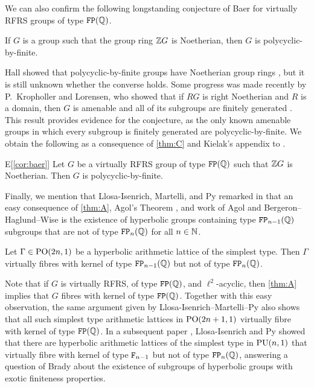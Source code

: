 \documentclass[11pt, letterpaper]{amsart}
\begin{document}
We can also confirm the following longstanding conjecture of Baer for virtually RFRS groups of type $\mathtt{FP}(\mathbb{Q})$.

\begin{conj}
If $G$ is a group such that the group ring $\mathbb{Z} G$ is Noetherian, then $G$ is polycyclic-by-finite.
\end{conj}

Hall showed that polycyclic-by-finite groups have Noetherian group rings \cite[Theorem 4]{Hall59}, but it is still unknown whether the converse holds. Some progress was made recently by P.~Kropholler and Lorensen, who showed that if $RG$ is right Noetherian and $R$ is a domain, then $G$ is amenable and all of its subgroups are finitely generated \cite[Corollary B]{KrophollerLorensen19}. This result provides evidence for the conjecture, as the only known amenable groups in which every subgroup is finitely generated are polycyclic-by-finite. We obtain the following as a consequence of \cref{thm:C} and Kielak's appendix to \cite{BartholdiKielakApp}.

\begin{manualcor}{E}[\cref{cor:baer}]
    Let $G$ be a virtually RFRS group of type $\mathtt{FP}(\mathbb{Q})$ such that $\mathbb{Z} G$ is Noetherian. Then $G$ is polycyclic-by-finite.
\end{manualcor}

Finally, we mention that Llosa-Isenrich, Martelli, and Py remarked in  \cite{isenrich2021hyperbolic} that an easy consequence of \cref{thm:A}, Agol's Theorem \cite{AgolHaken}, and work of Agol and Bergeron--Haglund--Wise \cite{BHW_2011} is the existence of hyperbolic groups containing type $\mathtt{FP}_{n-1}(\mathbb{Q})$ subgroups that are not of type $\mathtt{FP}_n(\mathbb{Q})$ for all $n \in \mathbb{N}$.

\begin{prop}\label{prop:LMP}
    Let $\Gamma \in \mathrm{PO}(2n,1)$ be a hyperbolic arithmetic lattice of the simplest type. Then $\Gamma$ virtually fibres with kernel of type $\mathtt{FP}_{n-1}(\mathbb{Q})$ but not of type $\mathtt{FP}_n(\mathbb{Q})$.
\end{prop}

Note that if $G$ is virtually RFRS, of type $\mathtt{FP}(\mathbb{Q})$, and $\ell^2$-acyclic, then \cref{thm:A} implies that $G$ fibres with kernel of type $\mathtt{FP}(\mathbb{Q})$. Together with this easy observation, the same argument given by Llosa-Isenrich--Martelli--Py also shows that all such simplest type arithmetic lattices in $\mathrm{PO}(2n+1,1)$ virtually fibre with kernel of type $\mathtt{FP}(\mathbb{Q})$. In a subsequent paper \cite{IsenrichPy2022}, Llosa-Isenrich and Py showed that there are hyperbolic arithmetic lattices of the simplest type in $\mathrm{PU}(n,1)$ that virtually fibre with kernel of type $\mathtt{F}_{n-1}$ but not of type $\mathtt{FP}_n(\mathbb{Q})$, answering a question of Brady about the existence of subgroups of hyperbolic groups with exotic finiteness properties.
\end{document}
